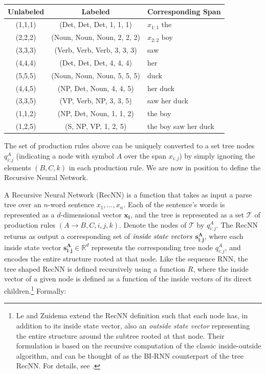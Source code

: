 \documentclass[jair,twoside,11pt,theapa]{article}
\newcommand{\m}[1]{\mathbf{#1}}%
\renewcommand{\shortcite}[0]{\citeyear}
\begin{document}
{\begin{center}
\begin{tabular}{c|c|l}
    Unlabeled & Labeled & Corresponding Span \\
    \hline
    (1,1,1)   & (Det, Det, Det, 1, 1, 1)       &  $x_{1:1}$ the    \\
    (2,2,2)   & (Noun, Noun, Noun, 2, 2, 2)    &  $x_{2:2}$ boy \\
    (3,3,3)   & (Verb, Verb, Verb, 3, 3, 3)    &  saw   \\
    (4,4,4)   & (Det, Det, Det, 4, 4, 4)       &  her  \\
    (5,5,5)   & (Noun, Noun, Noun, 5, 5, 5)        &  duck  \\
    (4,4,5)   & (NP, Det, Noun, 4, 4, 5)        &  her duck \\
    (3,3,5)   & (VP, Verb, NP, 3, 3, 5)        &  saw her duck \\
    (1,1,2)   & (NP, Det, Noun, 1, 1, 2)        &  the boy \\
    (1,2,5)   & (S, NP, VP, 1, 2, 5)        &  the boy saw her duck \\
\end{tabular}
\end{center}

The set of production rules above can be uniquely converted to a set tree nodes
$q^A_{i:j}$ (indicating a node with symbol $A$ over the span $x_{i:j}$) 
by simply ignoring
the elements $(B,C,k)$ in each production rule.  We are now in position to define
the Recursive Neural Network.

A Recursive Neural Network (RecNN) is a function that takes as input a parse
tree over an $n$-word sentence $x_1,\ldots,x_n$.  Each of the sentence's
words is represented as a $d$-dimensional vector $\m{x_i}$, and the tree is represented as
a set $\mathcal{T}$ of production rules $(A \rightarrow B,C,i,j,k)$.  Denote the nodes of
$\mathcal{T}$ by $q^A_{i:j}$.
The RecNN returns as output a corresponding set of
$\emph{inside state vectors}$ $\m{s^A_{i:j}}$, where each inside state vector
$\m{s^A_{i:j}} \in \mathbb{R}^d$ represents the
corresponding tree node $q^A_{i:j}$, and encodes the entire structure rooted at that node.
Like the sequence RNN, the tree shaped RecNN is defined recursively using a
function $R$, where the inside vector of a given node is defined as a function of the inside vectors of its
direct children.\footnote{Le and Zuidema \shortcite{le2014insideoutside} extend the RecNN
definition such that each node has, in addition to its inside state vector, also an 
\emph{outside state vector} representing the entire structure around the
subtree rooted at that node.  Their formulation is based on the recursive
computation of the classic inside-outside algorithm, and can be thought of as
the BI-RNN counterpart of the tree RecNN.  For details, see
\cite{le2014insideoutside}.}
Formally:

}
\end{document}
